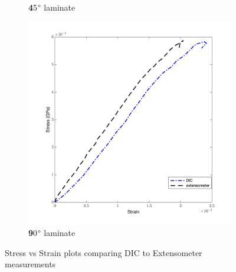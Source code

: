 \begin{figure}[!h]
\begin{center}
\begin{subfigure}[b]{0.45\linewidth}
        \caption{\textbf 45$\degree$ laminate}
        \label{fig:45lam}
    \end{subfigure}
    \end{center}
    \begin{center}
    \begin{subfigure}[b]{0.45\linewidth}
        \centering
        \includegraphics[width=\linewidth]{Pictures/stress vs strain/StressvsStrain_90.png}
        \caption{\textbf 90$\degree$ laminate}
        \label{fig:90lam}
    \end{subfigure}
    \end{center}
    \caption{Stress vs Strain plots comparing DIC to Extensometer measurements}
    \label{fig:stressvsstrain}
\end{figure}